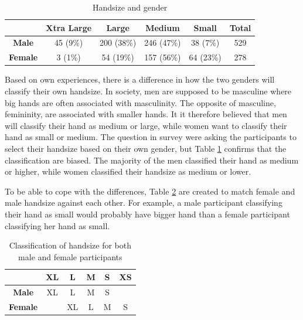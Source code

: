 {{    %
    \begin{table}[H]
      \centering
      \begin{tabular}{ c || c | c | c | c || c }
        \hline
        & {\bf Xtra Large} & {\bf Large} & {\bf Medium} & {\bf Small} & {\bf Total}\\ \hline
        {\bf Male} & 45 (9\%) & 200 (38\%) & 246 (47\%) & 38 (7\%) & 529 \\
        {\bf Female} & 3 (1\%) & 54 (19\%) & 157 (56\%) & 64 (23\%) & 278 \\ \hline
      \end{tabular}
      \caption{Handsize and gender}
      \label{tab:HandsizeGender}
    \end{table}

    Based on own experiences, there is a difference in how the two genders will classify their own handsize. In society, men are supposed to be masculine where big hands are often associated with masculinity. The opposite of masculine, femininity, are associated with smaller hands. It it therefore believed that men will classify their hand as medium or large, while women want to classify their hand as small or medium. The question in survey were asking the participants to select their handsize based on their own gender, but Table \ref{tab:HandsizeGender} confirms that the classification are biased. The majority of the men classified their hand as medium or higher, while women classified their handsize as medium or lower. 

    To be able to cope with the differences, Table \ref{tab:classificationhandsize} are created to match female and male handsize against each other. For example, a male participant classifying their hand as small would probably have bigger hand than a female participant classifying her hand as small. 

    \begin{table}[H]
      \centering
      \begin{tabular}{ c || c | c | c | c | c }
        \hline
         & {\bf XL} & {\bf L} & {\bf M} & {\bf S} & {\bf XS} \\ \hline\hline
        {\bf Male}   & XL & L  & M & S &   \\
        {\bf Female} &    & XL & L & M & S \\ \hline
      \end{tabular}
      \caption{Classification of handsize for both male and female participants}
      \label{tab:classificationhandsize}
    \end{table}

}}
